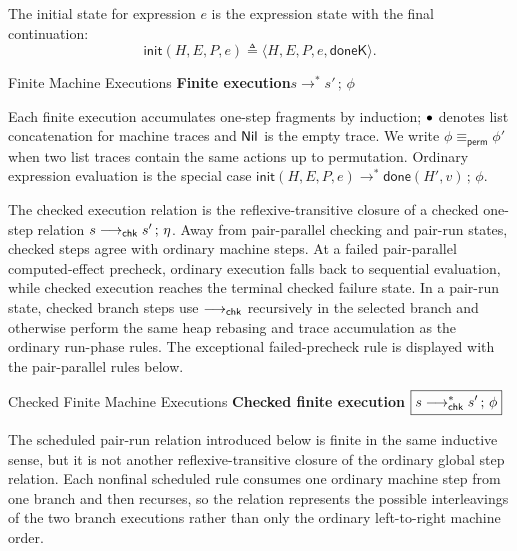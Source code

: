 The initial state for expression $e$ is the expression state with the final
continuation:
\[
\mathsf{init}(H,E,P,e)\triangleq
\langle H,E,P,e,\mathsf{doneK}\rangle.
\]

\begin{formalbox}{Finite Machine Executions}
\small
\noindent\textbf{Finite execution}\hfill $\boxed{s\longrightarrow^{*}s'\,;\,\phi}$

\end{formalbox}

Each finite execution accumulates one-step fragments by induction; $\mathbin{\bullet}$
denotes list concatenation for machine traces and $\mathsf{Nil}$ is the empty trace.
We write $\phi\equiv_{\mathsf{perm}}\phi'$ when two list traces contain the same
actions up to permutation.
Ordinary expression evaluation is the special case
$\mathsf{init}(H,E,P,e)\longrightarrow^{*}\mathsf{done}(H',v)\,;\,\phi$.

The checked execution relation is the reflexive-transitive closure
of a checked one-step relation $s\mathrel{\longrightarrow_{\mathsf{chk}}} s'\,;\,\eta$.  Away from
pair-parallel checking and pair-run states, checked steps agree with ordinary
machine steps. At a failed pair-parallel computed-effect precheck, ordinary
execution falls back to sequential evaluation, while checked execution reaches
the terminal checked failure state. In a pair-run state, checked branch steps
use $\mathrel{\longrightarrow_{\mathsf{chk}}}$ recursively in the selected branch and otherwise perform the
same heap rebasing and trace accumulation as the ordinary run-phase rules. The
exceptional failed-precheck rule is displayed with the pair-parallel rules
below.

\begin{formalbox}{Checked Finite Machine Executions}
\small
\noindent\textbf{Checked finite execution}\hfill
  $\boxed{s\mathrel{\longrightarrow^{*}_{\mathsf{chk}}} s'\,;\,\phi}$

\end{formalbox}

The scheduled pair-run relation introduced below is finite in the same
inductive sense, but it is not another reflexive-transitive closure of the
ordinary global step relation. Each nonfinal scheduled rule consumes one
ordinary machine step from one branch and then recurses, so the relation
represents the possible interleavings of the two branch executions rather than
only the ordinary left-to-right machine order.

